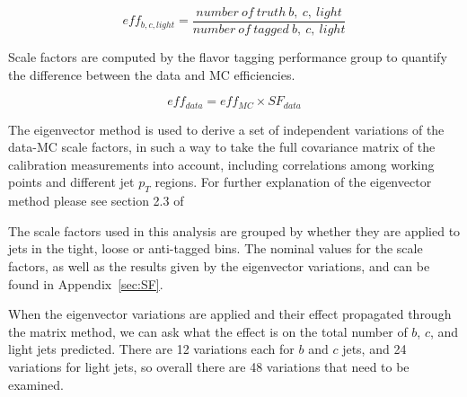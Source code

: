     \begin{equation}
        eff_{b,c,light}=\frac{number\ of\ truth\ b,\ c,\ light}{number\ of\ tagged\ b,\ c,\ light}
    \end{equation}

Scale factors are computed by the flavor tagging performance group to quantify the
difference between the data and MC efficiencies.

    \begin{equation}
        eff_{data}=eff_{MC}\times SF_{data}
    \end{equation}


The eigenvector method is used to derive a set of independent variations of the data-MC scale
factors, in such a way to take the full covariance matrix of the calibration measurements
into account, including correlations among working points and different jet $p_{T}$ regions.
For further explanation of the eigenvector method please see section 2.3 of%

The scale factors used in this analysis are grouped by whether they are applied to jets in the
tight, loose or anti-tagged bins.  The nominal values for the scale factors, as well as the results
given by the eigenvector variations, and can be found in Appendix~\ref{sec:SF}.

When the eigenvector variations are applied and their effect propagated through the matrix method,
we can ask what the effect is on the total number of $b$, $c$, and light jets predicted.
There are 12 variations each for $b$ and $c$ jets, and 24 variations for light jets, so
overall there are 48 variations that need to be examined.

